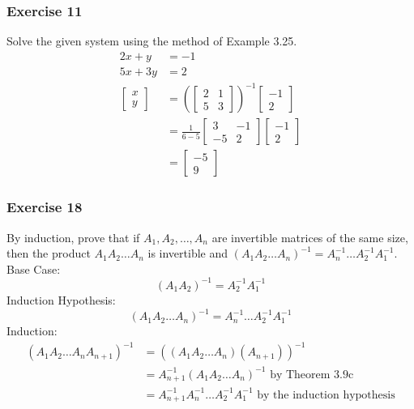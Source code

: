 \documentclass{math}
\begin{document}
\subsubsection*{Exercise 11}
Solve the given system using the method of Example 3.25.
\begin{align*}
  2x+y &= -1 \\
  5x+3y &= 2 \\
  \begin{bmatrix}x \\ y\end{bmatrix} &= \left(\begin{bmatrix}
    2 & 1 \\
    5 & 3
  \end{bmatrix}\right)^{-1}\begin{bmatrix}-1 \\ 2\end{bmatrix} \\
  &= \frac{1}{6-5}\begin{bmatrix}
    3 & -1 \\
    -5 & 2
  \end{bmatrix}\begin{bmatrix}-1 \\ 2\end{bmatrix} \\
  &= \begin{bmatrix}-5 \\ 9\end{bmatrix}
\end{align*}

\subsubsection*{Exercise 18}
By induction, prove that if \( A_1,A_2,\dots,A_n \) are invertible matrices of
the same size, then the product \( A_1A_2\dots A_n \) is invertible and
\( (A_1A_2\dots A_n)^{-1} = A_n^{-1}\dots A_2^{-1}A_1^{-1} \). \\
Base Case:
\[ (A_1A_2)^{-1} = A_2^{-1}A_1^{-1} \]
Induction Hypothesis:
\[ (A_1A_2\dots A_n)^{-1} = A_n^{-1}\dots A_2^{-1}A_1^{-1} \]
Induction:
\begin{align*}
  (A_1A_2\dots A_nA_{n+1})^{-1} &= ((A_1A_2\dots A_n)(A_{n+1}))^{-1} \\
  &= A_{n+1}^{-1}(A_1A_2\dots A_n)^{-1} \text{ by Theorem 3.9c} \\
  &= A_{n+1}^{-1}A_n^{-1}\dots A_2^{-1}A_1^{-1}
    \text{ by the induction hypothesis}
\end{align*}
\end{document}
